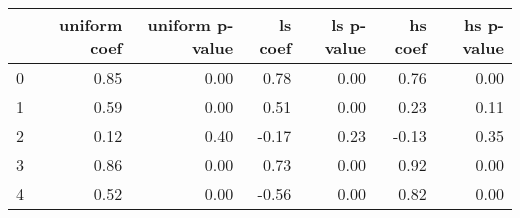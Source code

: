 \begin{tabular}{lrrrrrr}
\toprule
 & uniform coef & uniform p-value & ls coef & ls p-value & hs coef & hs p-value \\
\midrule
0 & 0.85 & 0.00 & 0.78 & 0.00 & 0.76 & 0.00 \\
1 & 0.59 & 0.00 & 0.51 & 0.00 & 0.23 & 0.11 \\
2 & 0.12 & 0.40 & -0.17 & 0.23 & -0.13 & 0.35 \\
3 & 0.86 & 0.00 & 0.73 & 0.00 & 0.92 & 0.00 \\
4 & 0.52 & 0.00 & -0.56 & 0.00 & 0.82 & 0.00 \\
\bottomrule
\end{tabular}
